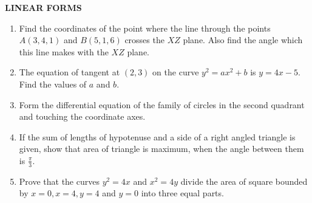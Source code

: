 \documentclass[12pt,-letter paper]{article}
\begin{document}
\begin{center}
	\textbf{LINEAR FORMS}
\end{center}
\begin{enumerate}
		\item Find the coordinates of the point where the line through the points$ A(3, 4, 1)$ and $B(5, 1, 6)$ crosses the $XZ$ plane. Also find the angle which this line makes with the $XZ$ plane.
\item The equation of tangent at $(2, 3)$ on the curve $y^2=ax^2+b$ is $y=4x-5$. Find the values of $a$ and $b$.
\item Form the differential equation of the family of circles in the second quadrant and touching the coordinate axes.
\item If the sum of lengths of hypotenuse and a side of a right angled triangle is given, show that area of triangle is maximum, when the angle between them is $\frac{\pi}{3}$.

\item Prove that the curves $y^2=4x$ and $x^2=4y$ divide the area of square bounded by $x=0, x=4, y=4$ and $y=0$ into three equal parts.

\end{enumerate}
\end{document}
